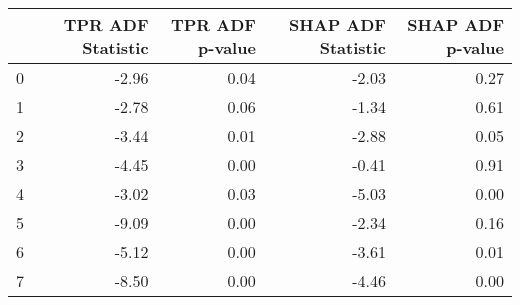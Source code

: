 \begin{tabular}{lrrrr}
\toprule
 & TPR ADF Statistic & TPR ADF p-value & SHAP ADF Statistic & SHAP ADF p-value \\
\midrule
0 & -2.96 & 0.04 & -2.03 & 0.27 \\
1 & -2.78 & 0.06 & -1.34 & 0.61 \\
2 & -3.44 & 0.01 & -2.88 & 0.05 \\
3 & -4.45 & 0.00 & -0.41 & 0.91 \\
4 & -3.02 & 0.03 & -5.03 & 0.00 \\
5 & -9.09 & 0.00 & -2.34 & 0.16 \\
6 & -5.12 & 0.00 & -3.61 & 0.01 \\
7 & -8.50 & 0.00 & -4.46 & 0.00 \\
\bottomrule
\end{tabular}
